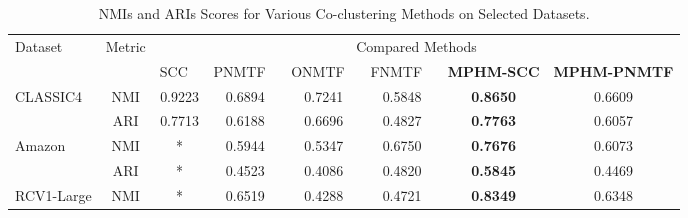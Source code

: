 \documentclass[journal]{IEEEtran}
\renewcommand{\cite}[1]{~\autocite{#1}}
\begin{document}
\begin{table}[htbp]
  \centering
  \caption{NMIs and ARIs Scores for Various Co-clustering Methods on Selected Datasets.}
  \label{tab:evaluation-metrics}
  \begin{tabular}{@{} l c cccccc @{}}
    \toprule
    \multirow{2}{*}{Dataset}    & \multirow{2}{*}{Metric} & \multicolumn{6}{c}{Compared Methods}                                                                                                                                                                                                       \\
    \cmidrule{3-8}
                                &                         & SCC \cite{dhillon2001CoclusteringDocumentsWords} & PNMTF \cite{chen2023ParallelNonNegativeMatrix} & ONMTF \cite{ding2006OrthogonalNonnegativeMatrix} & FNMTF \cite{kim2011FastNonnegativeMatrix} & \textbf{MPHM-SCC} & \textbf{MPHM-PNMTF} \\
    \midrule
    \multirow{2}{*}{CLASSIC4}   & NMI                     & 0.9223                                           & 0.6894                                         & 0.7241                                           & 0.5848                                    & \textbf{0.8650}   & 0.6609              \\
                                & ARI                     & 0.7713                                           & 0.6188                                         & 0.6696                                           & 0.4827                                    & \textbf{0.7763}   & 0.6057              \\
    \multirow{2}{*}{Amazon}     & NMI                     & *                                                & 0.5944                                         & 0.5347                                           & 0.6750                                    & \textbf{0.7676}   & 0.6073              \\
                                & ARI                     & *                                                & 0.4523                                         & 0.4086                                           & 0.4820                                    & \textbf{0.5845}   & 0.4469              \\
    \multirow{2}{*}{RCV1-Large} & NMI                     & *                                                & 0.6519                                         & 0.4288                                           & 0.4721                                    & \textbf{0.8349}   & 0.6348              \\

\end{tabular}
\end{table}
\end{document}
